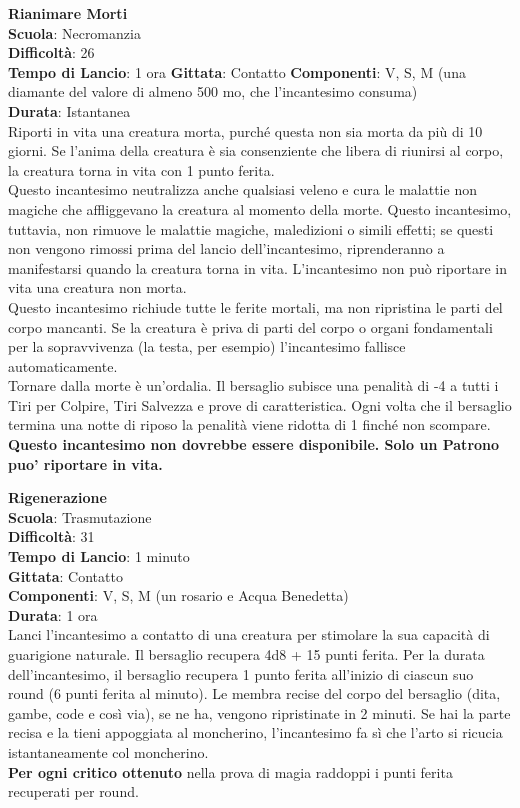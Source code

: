 \begin{multicols}{2}
\medskip\textbf{Rianimare Morti}\\
\textbf{Scuola}: Necromanzia\\
\textbf{Difficoltà}: 26\\
\textbf{Tempo di Lancio}: 1 ora
\textbf{Gittata}: Contatto
\textbf{Componenti}: V, S, M (una diamante del valore di almeno 500 mo, che l'incantesimo consuma)\\
\textbf{Durata}: Istantanea\\
Riporti in vita una creatura morta, purché questa non sia morta da più di 10 giorni. Se l'anima della creatura è sia consenziente che libera di riunirsi al corpo, la creatura torna in vita con 1 punto ferita.\\
Questo incantesimo neutralizza anche qualsiasi veleno e cura le malattie non magiche che affliggevano la creatura al momento della morte. Questo incantesimo, tuttavia, non rimuove le malattie magiche, maledizioni o simili effetti; se questi non vengono rimossi prima del lancio dell'incantesimo, riprenderanno a manifestarsi quando la creatura torna in vita. L'incantesimo non può riportare in vita una creatura non morta.\\
Questo incantesimo richiude tutte le ferite mortali, ma non ripristina le parti del corpo mancanti. Se la creatura è priva di parti del corpo o organi fondamentali per la sopravvivenza (la testa, per esempio) l'incantesimo fallisce automaticamente.\\
Tornare dalla morte è un'ordalia. Il bersaglio subisce una penalità di -4 a tutti i Tiri per Colpire, Tiri Salvezza e prove di caratteristica. Ogni volta che il bersaglio termina una notte di riposo la penalità viene ridotta di 1 finché non scompare.\\
\textbf{Questo incantesimo non dovrebbe essere disponibile. Solo un Patrono puo' riportare in vita.}

\medskip\textbf{Rigenerazione}\\
\textbf{Scuola}: Trasmutazione\\
\textbf{Difficoltà}: 31\\
\textbf{Tempo di Lancio}: 1 minuto\\
\textbf{Gittata}: Contatto\\
\textbf{Componenti}: V, S, M (un rosario e Acqua Benedetta)\\
\textbf{Durata}: 1 ora\\
Lanci l'incantesimo a contatto di una creatura per stimolare la sua capacità di guarigione naturale. Il bersaglio recupera 4d8 + 15 punti ferita. Per la durata dell'incantesimo, il bersaglio recupera 1 punto ferita all'inizio di ciascun suo round (6 punti ferita al minuto). Le membra recise del corpo del bersaglio (dita, gambe, code e così via), se ne ha, vengono ripristinate in 2 minuti. Se hai la parte recisa e la tieni appoggiata al moncherino, l'incantesimo fa sì che l'arto si ricucia istantaneamente col moncherino.\\
\textbf{Per ogni critico ottenuto} nella prova di magia raddoppi i punti ferita recuperati per round.


\end{multicols}
